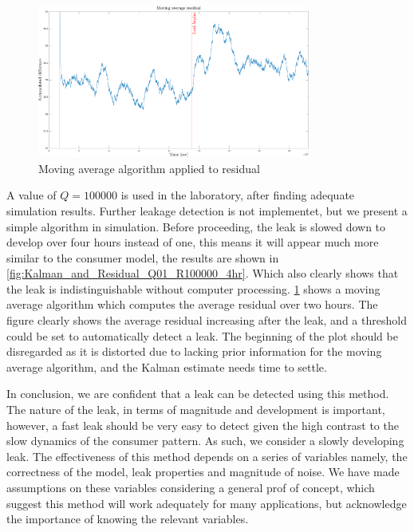 \begin{figure}[h!]
	\centering
	\includegraphics[width=0.8\textwidth]{Pictures/MA_residual_Q01_R100000_AVRG4hr.pdf}
	
	\caption{Moving average algorithm applied to residual}
	\label{fig:Movingaverage}
\end{figure}

A value of $Q = 100000$ is used in the laboratory, after finding adequate simulation results. Further leakage detection is not implementet, but we present a simple algorithm in simulation. Before proceeding, the leak is slowed down to develop over four hours instead of one, this means it will appear much more similar to the consumer model, the results are shown in \ref{fig:Kalman_and_Residual_Q01_R100000_4hr}. Which also clearly shows that the leak is indistinguishable without computer processing. \ref{fig:Movingaverage} shows a moving average algorithm which computes the average residual over two hours. The figure clearly shows the average residual increasing after the leak, and a threshold could be set to automatically detect a leak. The beginning of the plot should be disregarded as it is distorted due to lacking prior information for the moving average algorithm, and the Kalman estimate needs time to settle.

In conclusion, we are confident that a leak can be detected using this method. The nature of the leak, in terms of magnitude and development is important, however, a fast leak should be very easy to detect given the high contrast to the slow dynamics of the consumer pattern. As such, we consider a slowly developing leak. The effectiveness of this method depends on a series of variables namely, the correctness of the model, leak properties and magnitude of noise. We have made assumptions on these variables considering a general prof of concept, which suggest this method will work adequately for many applications, but acknowledge the importance of knowing the relevant variables.